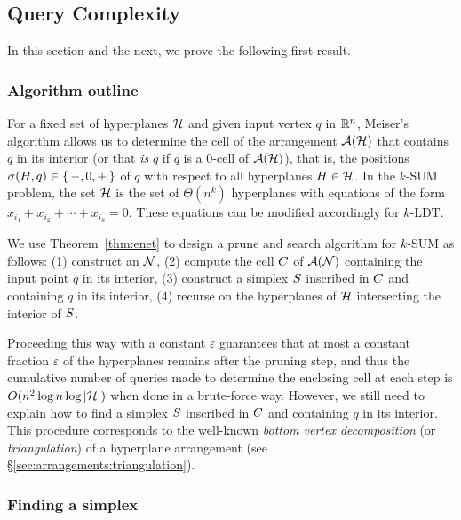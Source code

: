 \subsection{Query Complexity}%
\label{paper:ksum-algorithm:contrib:query-complexity}

In this section and the next, we prove the following first result.
\restate{\TheoremKSUMCube*}

\subsubsection{Algorithm outline}
For a fixed set of hyperplanes \(\mathcal{H}\) and given input vertex \(q\) in \(\mathbb{R}^n\),
Meiser's algorithm allows us to determine the cell of the arrangement
$\mathcal{A}(\mathcal{H})$ that contains $q$ in its interior (or that \emph{is} $q$ if
$q$ is a $0$-cell of $\mathcal{A}(\mathcal{H})$), that is, the positions $\sigma(H,q) \in
\left\{\,{-, 0, +}\,\right\}$ of \(q\) with respect to all hyperplanes $H \in \mathcal{H}$. In the \(k\)-SUM
problem, the set $\mathcal{H}$ is the set of $\Theta(n^k)$ hyperplanes with equations of the
form $x_{i_1} + x_{i_2} + \cdots + x_{i_k} = 0$.
These equations can be modified accordingly for \(k\)-LDT.

We use Theorem~\ref{thm:enet} to design a prune and search algorithm for
\(k\)-SUM as follows:
(1) construct an \enet{} \(\mathcal{N}\),
(2) compute the cell \(C\) of \(\mathcal{A}(\mathcal{N})\) containing the input
point $q$ in its interior,
(3) construct a simplex \(S\) inscribed in \(C\) and containing
\(q\) in its interior,
(4) recurse on the hyperplanes of \(\mathcal{H}\) intersecting the interior of
\(S\).

Proceeding this way with a constant $\varepsilon$ guarantees that at most a
constant fraction \(\varepsilon\) of the hyperplanes remains after the pruning step,
and thus the cumulative number of queries made to determine the enclosing cell at
each step is $O(n^2 \log n \log |{\mathcal{H}}|)$ when done in a brute-force way.
However, we still need to explain how to find a simplex \(S\) inscribed
in \(C\) and containing \(q\) in its interior.
%
This procedure corresponds to the well-known
\emph{bottom vertex decomposition} (or \emph{triangulation}) of a hyperplane
arrangement (see \S\ref{sec:arrangements:triangulation}).

\subsubsection{Finding a simplex}


